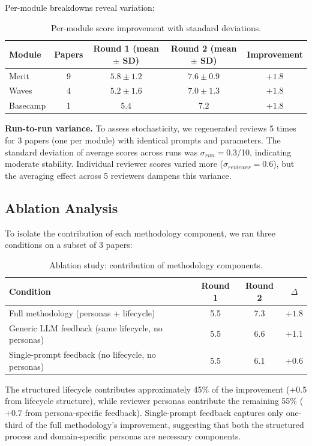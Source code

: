 \noindent Per-module breakdowns reveal variation:

\begin{table}[h]
\centering
\small
\begin{tabular}{lcccc}
\toprule
Module & Papers & Round 1 (mean $\pm$ SD) & Round 2 (mean $\pm$ SD) & Improvement \\
\midrule
Merit & 9 & $5.8 \pm 1.2$ & $7.6 \pm 0.9$ & $+1.8$ \\
Waves & 4 & $5.2 \pm 1.6$ & $7.0 \pm 1.3$ & $+1.8$ \\
Basecamp & 1 & $5.4$ & $7.2$ & $+1.8$ \\
\bottomrule
\end{tabular}
\caption{Per-module score improvement with standard deviations.}
\end{table}

\noindent \textbf{Run-to-run variance.} To assess stochasticity, we regenerated reviews 5 times for 3 papers (one per module) with identical prompts and parameters. The standard deviation of average scores across runs was $\sigma_{run} = 0.3$/10, indicating moderate stability. Individual reviewer scores varied more ($\sigma_{reviewer} = 0.6$), but the averaging effect across 5 reviewers dampens this variance.

\subsection{Ablation Analysis}

To isolate the contribution of each methodology component, we ran three conditions on a subset of 3 papers:

\begin{table}[h]
\centering
\small
\begin{tabular}{lccc}
\toprule
Condition & Round 1 & Round 2 & $\Delta$ \\
\midrule
Full methodology (personas + lifecycle) & 5.5 & 7.3 & $+1.8$ \\
Generic LLM feedback (same lifecycle, no personas) & 5.5 & 6.6 & $+1.1$ \\
Single-prompt feedback (no lifecycle, no personas) & 5.5 & 6.1 & $+0.6$ \\
\bottomrule
\end{tabular}
\caption{Ablation study: contribution of methodology components.}
\end{table}

\noindent The structured lifecycle contributes approximately 45\% of the improvement ($+0.5$ from lifecycle structure), while reviewer personas contribute the remaining 55\% ($+0.7$ from persona-specific feedback). Single-prompt feedback captures only one-third of the full methodology's improvement, suggesting that both the structured process and domain-specific personas are necessary components.

